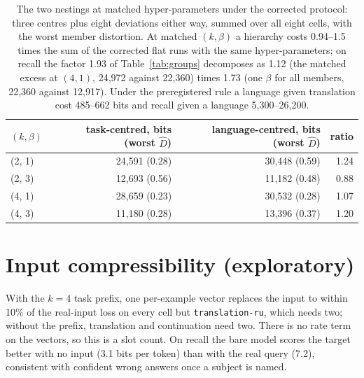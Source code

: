 \documentclass{article}
\newcommand{\Dh}{\hat D}
\newcommand{\cell}[1]{\texttt{#1}}
\begin{document}
\begin{table}[H]
\centering\small
\begin{tabular}{lrrr}
\toprule
$(k,\beta)$ & task-centred, bits (worst $\Dh$) & language-centred, bits (worst $\Dh$) & ratio \\
\midrule
(2, 1) & 24,591 (0.28) & 30,448 (0.59) & 1.24 \\
(2, 3) & 12,693 (0.56) & 11,182 (0.48) & 0.88 \\
(4, 1) & 28,659 (0.23) & 30,532 (0.28) & 1.07 \\
(4, 3) & 11,180 (0.28) & 13,396 (0.37) & 1.20 \\
\bottomrule
\end{tabular}
\caption{The two nestings at matched hyper-parameters under the corrected protocol: three centres plus eight deviations either way, summed over all eight cells, with the worst member distortion. At matched $(k,\beta)$ a hierarchy costs 0.94--1.5 times the sum of the corrected flat runs with the same hyper-parameters; on recall the factor 1.93 of Table~\ref{tab:groups} decomposes as 1.12 (the matched excess at $(4,1)$, 24,972 against 22,360) times 1.73 (one $\beta$ for all members, 22,360 against 12,917). Under the preregistered rule a language given translation cost 485--662 bits and recall given a language 5,300--26,200.}
\label{tab:nestings}
\end{table}

\FloatBarrier
\section{Input compressibility (exploratory)}\label{app:regime2}
With the $k=4$ task prefix, one per-example vector replaces the input to within 10\% of the real-input loss on every cell but \cell{translation-ru}, which needs two; without the prefix, translation and continuation need two. There is no rate term on the vectors, so this is a slot count. On recall the bare model scores the target better with no input (3.1 bits per token) than with the real query (7.2), consistent with confident wrong answers once a subject is named.

\FloatBarrier
\end{document}
